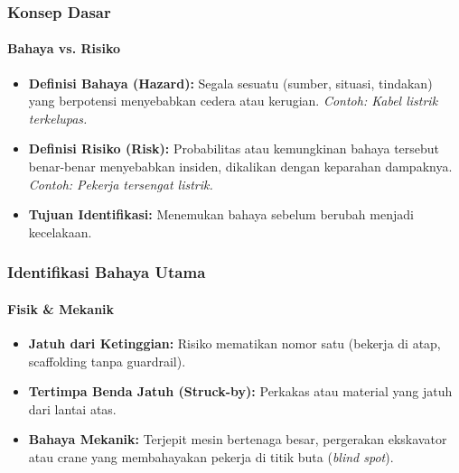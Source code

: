 \documentclass[../main.tex]{subfiles}
\begin{document}
\begin{frame}[mytitle=imageplus, c, mycolor=digiPH_cream]
	\frametitle{Konsep Dasar}
	\framesubtitle{Bahaya vs. Risiko}

	\begin{itemize}
		\item \textbf{Definisi Bahaya (Hazard):} Segala sesuatu (sumber, situasi, tindakan) yang berpotensi menyebabkan cedera atau kerugian. \textit{Contoh: Kabel listrik terkelupas.}
		\item \textbf{Definisi Risiko (Risk):} Probabilitas atau kemungkinan bahaya tersebut benar-benar menyebabkan insiden, dikalikan dengan keparahan dampaknya. \textit{Contoh: Pekerja tersengat listrik.}
		\item \textbf{Tujuan Identifikasi:} Menemukan bahaya sebelum berubah menjadi kecelakaan.
	\end{itemize}

	\vfill
\end{frame}

\begin{frame}[mytitle=standard, t, mycolor=digiPH_gray]
	\frametitle{Identifikasi Bahaya Utama}
	\framesubtitle{Fisik \& Mekanik}

	\begin{itemize}
		\item \textbf{Jatuh dari Ketinggian:} Risiko mematikan nomor satu (bekerja di atap, scaffolding tanpa guardrail).
		\item \textbf{Tertimpa Benda Jatuh (Struck-by):} Perkakas atau material yang jatuh dari lantai atas.
		\item \textbf{Bahaya Mekanik:} Terjepit mesin bertenaga besar, pergerakan ekskavator atau crane yang membahayakan pekerja di titik buta (\textit{blind spot}).
	\end{itemize}

	\vfill
\end{frame}
\end{document}
